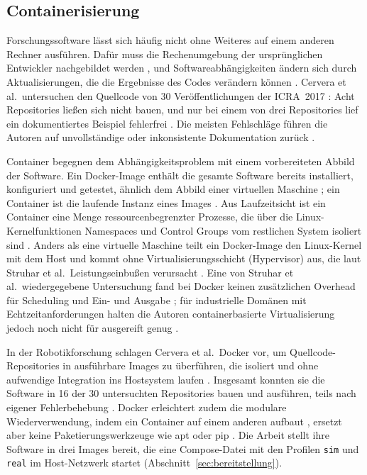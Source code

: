 \subsection{Containerisierung}
\label{sec:container}
Forschungssoftware lässt sich häufig nicht ohne Weiteres auf einem anderen Rechner ausführen.
Dafür muss die Rechenumgebung der ursprünglichen Entwickler nachgebildet werden \cite{Boettiger2015}, und Softwareabhängigkeiten ändern sich durch Aktualisierungen, die die Ergebnisse des Codes verändern können \cite{Boettiger2015}.
Cervera et al.\ untersuchen den Quellcode von 30 Veröffentlichungen der ICRA~2017 \cite{Cervera2019}: Acht Repositories ließen sich nicht bauen, und nur bei einem von drei Repositories lief ein dokumentiertes Beispiel fehlerfrei \cite{Cervera2019}.
Die meisten Fehlschläge führen die Autoren auf unvollständige oder inkonsistente Dokumentation zurück \cite{Cervera2019}.

Container begegnen dem Abhängigkeitsproblem mit einem vorbereiteten Abbild der Software.
Ein Docker-Image enthält die gesamte Software bereits installiert, konfiguriert und getestet, ähnlich dem Abbild einer virtuellen Maschine \cite{Boettiger2015}; ein Container ist die laufende Instanz eines Images \cite{Boettiger2015}.
Aus Laufzeitsicht ist ein Container eine Menge ressourcenbegrenzter Prozesse, die über die Linux-Kernelfunktionen Namespaces und Control Groups vom restlichen System isoliert sind \cite{Struhar2020}.
Anders als eine virtuelle Maschine teilt ein Docker-Image den Linux-Kernel mit dem Host \cite{Boettiger2015} und kommt ohne Virtualisierungsschicht (Hypervisor) aus, die laut Struhar et al.\ Leistungseinbußen verursacht \cite{Struhar2020}.
Eine von Struhar et al.\ wiedergegebene Untersuchung fand bei Docker keinen zusätzlichen Overhead für Scheduling und Ein- und Ausgabe \cite{Struhar2020}; für industrielle Domänen mit Echtzeitanforderungen halten die Autoren containerbasierte Virtualisierung jedoch noch nicht für ausgereift genug \cite{Struhar2020}.

In der Robotikforschung schlagen Cervera et al.\ Docker vor, um Quellcode-Repositories in ausführbare Images zu überführen, die isoliert und ohne aufwendige Integration ins Hostsystem laufen \cite{Cervera2019}.
Insgesamt konnten sie die Software in 16 der 30 untersuchten Repositories bauen und ausführen, teils nach eigener Fehlerbehebung \cite{Cervera2019}.
Docker erleichtert zudem die modulare Wiederverwendung, indem ein Container auf einem anderen aufbaut \cite{Boettiger2015}, ersetzt aber keine Paketierungswerkzeuge wie apt oder pip \cite{Cervera2019}.
Die Arbeit stellt ihre Software in drei Images bereit, die eine Compose-Datei mit den Profilen \texttt{sim} und \texttt{real} im Host-Netzwerk startet (Abschnitt~\ref{sec:bereitstellung}).

